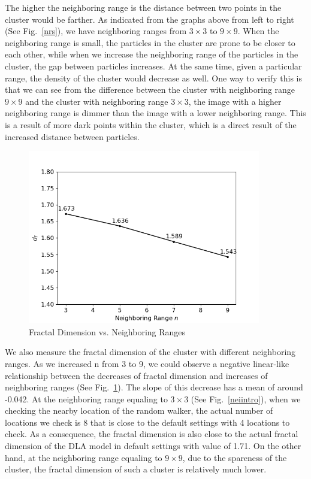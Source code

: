 \documentclass[aps,preprint,groupedaddress,letterpaper]{revtex4-1}
\begin{document}
The higher the neighboring range is the distance between two points in the cluster would be farther. As indicated from the graphs above from left to right (See Fig.~\ref{nrs}), we have neighboring ranges from $3 \times 3$ to $9 \times 9$. When the neighboring range is small, the particles in the cluster are prone to be closer to each other, while when we increase the neighboring range of the particles in the cluster, the gap between particles increases. At the same time, given a particular range, the density of the cluster would decrease as well. One way to verify this is that we can see from the difference between the cluster with neighboring range $9 \times 9$ and the cluster with neighboring range $3 \times 3$, the image with a higher neighboring range is dimmer than the image with a lower neighboring range. This is a result of more dark points within the cluster, which is a direct result of the increased distance between particles. 

\begin{figure}[h]
\centering
\includegraphics[width=4.0in]{img/Neighbor/dfNeighbor.png}
\caption{Fractal Dimension vs. Neighboring Ranges
\label{dfnr}}
\end{figure}

We also measure the fractal dimension of the cluster with different neighboring ranges. As we increased n from 3 to 9,  we could observe a negative linear-like relationship between the decreases of fractal dimension and increases of neighboring ranges (See Fig.~\ref{dfnr}). The slope of this decrease has a mean of around  -0.042. At the neighboring range equaling to $3 \times 3$ (See Fig.~\ref{neiintro}), when we checking the nearby location of the random walker, the actual number of locations we check is 8 that is close to the default settings with 4 locations to check. As a consequence, the fractal dimension is also close to the actual fractal dimension of the DLA model in default settings with value of 1.71. On the other hand, at the neighboring range equaling to $9 \times 9$, due to the spareness of the cluster, the fractal dimension of such a cluster is relatively much lower. 
\end{document}

